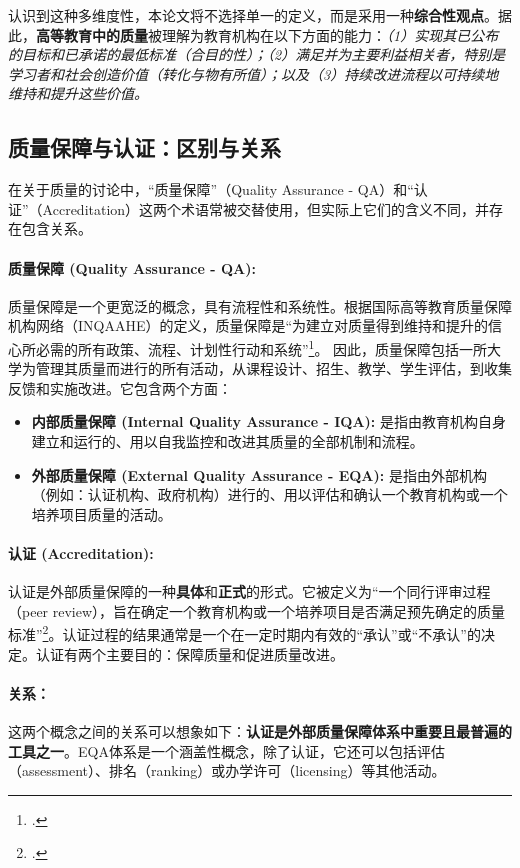 认识到这种多维度性，本论文将不选择单一的定义，而是采用一种\textbf{综合性观点}。据此，\textbf{高等教育中的质量}被理解为教育机构在以下方面的能力：\textit{（1）实现其已公布的目标和已承诺的最低标准（合目的性）；（2）满足并为主要利益相关者，特别是学习者和社会创造价值（转化与物有所值）；以及（3）持续改进流程以可持续地维持和提升这些价值。}

\subsection{质量保障与认证：区别与关系}
\label{subsec:khai_niem_dbcl_kd}

在关于质量的讨论中，“质量保障”（Quality Assurance - QA）和“认证”（Accreditation）这两个术语常被交替使用，但实际上它们的含义不同，并存在包含关系。

\paragraph{质量保障 (Quality Assurance - QA):}
质量保障是一个更宽泛的概念，具有流程性和系统性。根据国际高等教育质量保障机构网络（INQAAHE）的定义，质量保障是“为建立对质量得到维持和提升的信心所必需的所有政策、流程、计划性行动和系统”\footcite{INQAAHE_Glossary}。
因此，质量保障包括一所大学为管理其质量而进行的所有活动，从课程设计、招生、教学、学生评估，到收集反馈和实施改进。它包含两个方面：
\begin{itemize}
    \item \textbf{内部质量保障 (Internal Quality Assurance - IQA):} 是指由教育机构自身建立和运行的、用以自我监控和改进其质量的全部机制和流程。
    \item \textbf{外部质量保障 (External Quality Assurance - EQA):} 是指由外部机构（例如：认证机构、政府机构）进行的、用以评估和确认一个教育机构或一个培养项目质量的活动。
\end{itemize}

\paragraph{认证 (Accreditation):}
认证是外部质量保障的一种\textbf{具体}和\textbf{正式}的形式。它被定义为“一个同行评审过程（peer review），旨在确定一个教育机构或一个培养项目是否满足预先确定的质量标准”\footcite{CHEA_Definition}。认证过程的结果通常是一个在一定时期内有效的“承认”或“不承认”的决定。认证有两个主要目的：保障质量和促进质量改进。

\paragraph{关系：}
这两个概念之间的关系可以想象如下：\textbf{认证是外部质量保障体系中重要且最普遍的工具之一}。EQA体系是一个涵盖性概念，除了认证，它还可以包括评估（assessment）、排名（ranking）或办学许可（licensing）等其他活动。

